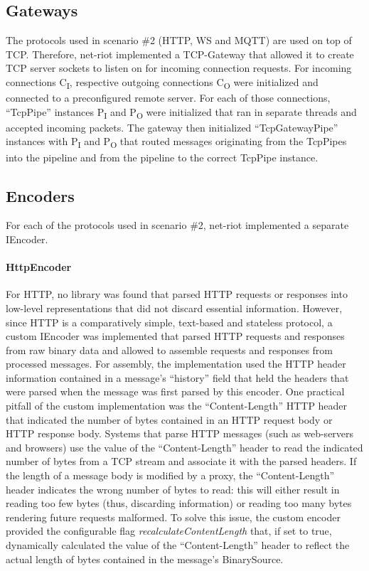 \subsection{Gateways}
The protocols used in scenario \#2 (\ac{HTTP}, \ac{WS} and \ac{MQTT}) are used on top of \ac{TCP}. Therefore, net-riot implemented a \ac{TCP}-Gateway that allowed it to create \ac{TCP} server sockets to listen on for incoming connection requests. For incoming connections C\textsubscript{I}, respective outgoing connections C\textsubscript{O} were initialized and connected to a preconfigured remote server. For each of those connections, \enquote{TcpPipe} instances P\textsubscript{I} and P\textsubscript{O} were initialized that ran in separate threads and accepted incoming packets. The gateway then initialized \enquote{TcpGatewayPipe} instances with P\textsubscript{I} and P\textsubscript{O} that routed messages originating from the TcpPipes into the pipeline and from the pipeline to the correct TcpPipe instance.

\subsection{Encoders}
For each of the protocols used in scenario \#2, net-riot implemented a separate IEncoder.
\paragraph{HttpEncoder} For \ac{HTTP}, no library was found that parsed \ac{HTTP} requests or responses into low-level representations that did not discard essential information. However, since \ac{HTTP} is a comparatively simple, text-based and stateless protocol, a custom IEncoder was implemented that parsed \ac{HTTP} requests and responses from raw binary data and allowed to assemble requests and responses from processed messages. For assembly, the implementation used the \ac{HTTP} header information contained in a message's \enquote{history} field that held the headers that were parsed when the message was first parsed by this encoder. One practical pitfall of the custom implementation was the \enquote{Content-Length} \ac{HTTP} header that indicated the number of bytes contained in an \ac{HTTP} request body or \ac{HTTP} response body. Systems that parse \ac{HTTP} messages (such as web-servers and browsers) use the value of the \enquote{Content-Length} header to read the indicated number of bytes from a \ac{TCP} stream and associate it with the parsed headers. If the length of a message body is modified by a proxy, the \enquote{Content-Length} header indicates the wrong number of bytes to read: this will either result in reading too few bytes (thus, discarding information) or reading too many bytes rendering future requests malformed. To solve this issue, the custom encoder provided the configurable flag \emph{recalculateContentLength} that, if set to true, dynamically calculated the value of the \enquote{Content-Length} header to reflect the actual length of bytes contained in the message's BinarySource.
